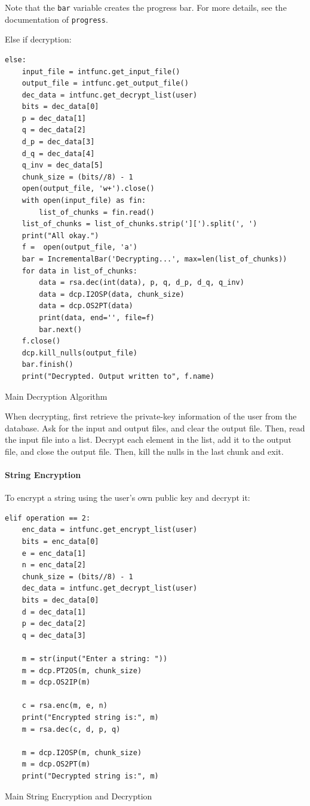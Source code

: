\documentclass{article}
\newenvironment{longlisting}{\captionsetup{type=listing}}{}
\begin{document}
Note that the \texttt{bar} variable creates the progress bar. For more details, see the
documentation of \texttt{progress}.

Else if decryption:

\begin{longlisting}
\begin{verbatim}
else:
    input_file = intfunc.get_input_file()
    output_file = intfunc.get_output_file()
    dec_data = intfunc.get_decrypt_list(user)
    bits = dec_data[0]
    p = dec_data[1]
    q = dec_data[2]
    d_p = dec_data[3]
    d_q = dec_data[4]
    q_inv = dec_data[5]
    chunk_size = (bits//8) - 1
    open(output_file, 'w+').close()
    with open(input_file) as fin:
        list_of_chunks = fin.read()
    list_of_chunks = list_of_chunks.strip('][').split(', ')
    print("All okay.")
    f =  open(output_file, 'a')
    bar = IncrementalBar('Decrypting...', max=len(list_of_chunks))
    for data in list_of_chunks:
        data = rsa.dec(int(data), p, q, d_p, d_q, q_inv)
        data = dcp.I2OSP(data, chunk_size)
        data = dcp.OS2PT(data)
        print(data, end='', file=f)
        bar.next()
    f.close()
    dcp.kill_nulls(output_file)
    bar.finish()
    print("Decrypted. Output written to", f.name)
\end{verbatim}
\caption{Main Decryption Algorithm}
\end{longlisting}
When decrypting, first retrieve the private-key information of the user from the database. Ask for
the input and output files, and clear the output file. Then, read the input file into a list.
Decrypt each element in the list, add it to the output file, and close the output file. Then, kill
the nulls in the last chunk and exit.


\paragraph{String Encryption}
To encrypt a string using the user's own public key and decrypt it:
\begin{longlisting}
\begin{verbatim}
elif operation == 2:
    enc_data = intfunc.get_encrypt_list(user)
    bits = enc_data[0]
    e = enc_data[1]
    n = enc_data[2]
    chunk_size = (bits//8) - 1
    dec_data = intfunc.get_decrypt_list(user)
    bits = dec_data[0]
    d = dec_data[1]
    p = dec_data[2]
    q = dec_data[3]

    m = str(input("Enter a string: "))
    m = dcp.PT2OS(m, chunk_size)
    m = dcp.OS2IP(m)

    c = rsa.enc(m, e, n)
    print("Encrypted string is:", m)
    m = rsa.dec(c, d, p, q)

    m = dcp.I2OSP(m, chunk_size)
    m = dcp.OS2PT(m)
    print("Decrypted string is:", m)
\end{verbatim}
\caption{Main String Encryption and Decryption}
\end{longlisting}
\end{document}
